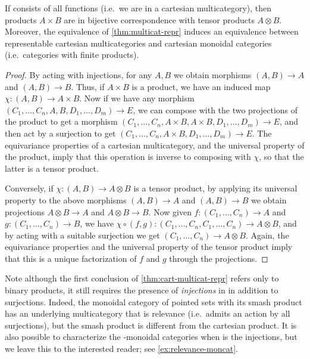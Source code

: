 \documentclass{book}
\let\tensor\otimes
\begin{document}
\begin{thm}\label{thm:cart-multicat-repr}
  If \fS consists of all functions (i.e.\ we are in a cartesian multicategory), then products $A\times B$ are in bijective correspondence with tensor products $A\tensor B$.
  Moreover, the equivalence of \cref{thm:multicat-repr} induces an equivalence between representable cartesian multicategories and cartesian monoidal categories (i.e.\ categories with finite products).
\end{thm}
\begin{proof}
  By acting with injections, for any $A,B$ we obtain morphisms $(A,B)\to A$ and $(A,B)\to B$.
  Thus, if $A\times B$ is a product, we have an induced map $\chi:(A,B)\to A\times B$.
  Now if we have any morphism $(C_1,\dots,C_n,A,B,D_1,\dots,D_m)\to E$, we can compose with the two projections of the product to get a morphism $(C_1,\dots,C_n,A\times B,A\times B,D_1,\dots,D_m)\to E$, and then act by a surjection to get $(C_1,\dots,C_n,A\times B,D_1,\dots,D_m)\to E$.
  The equivariance properties of a cartesian multicategory, and the universal property of the product, imply that this operation is inverse to composing with $\chi$, so that the latter is a tensor product.

  Conversely, if $\chi:(A,B)\to A\tensor B$ is a tensor product, by applying its universal property to the above morphisms $(A,B)\to A$ and $(A,B)\to B$ we obtain projections $A\tensor B \to A$ and $A\tensor B\to B$.
  Now given $f:(C_1,\dots,C_n)\to A$ and $g:(C_1,\dots,C_n)\to B$, we have $\chi\circ (f,g) : (C_1,\dots,C_n,C_1,\dots,C_n) \to A\tensor B$, and by acting with a suitable surjection we get $(C_1,\dots,C_n)\to A\tensor B$.
  Again, the equivariance properties and the universal property of the tensor product imply that this is a unique factorization of $f$ and $g$ through the projections.
\end{proof}

Note although the first conclusion of \cref{thm:cart-multicat-repr} refers only to binary products, it still requires the presence of \emph{injections} in \fS in addition to surjections.
Indeed, the monoidal category of pointed sets with its smash product has an underlying multicategory that is relevance (i.e.\ admits an action by all surjections), but the smash product is different from the cartesian product.
It is also possible to characterize the \fS-monoidal categories when \fS is the injections, but we leave this to the interested reader; see \cref{ex:relevance-moncat}.
\end{document}
